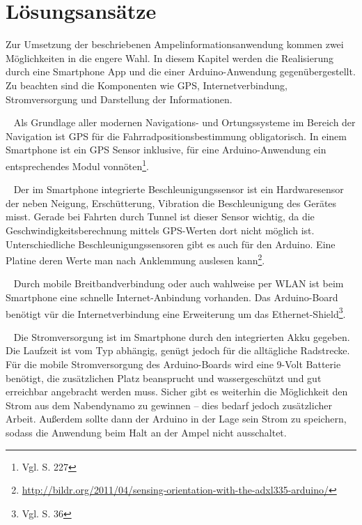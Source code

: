 \chapter{Lösungsansätze}
Zur Umsetzung der beschriebenen Ampelinformationsanwendung kommen zwei Möglichkeiten in die engere Wahl. In diesem Kapitel werden die Realisierung durch eine \gls{Smartphone} \Gls{App} und die einer \gls{Arduino}-Anwendung gegenübergestellt. Zu beachten sind die Komponenten wie \gls{GPS}, Internetverbindung, Stromversorgung und Darstellung der Informationen.\\
\begin{description}[leftmargin=0.7cm,style=nextline]
  \item[\gls{GPS}] ~ Als Grundlage aller modernen Navigations- und Ortungssysteme im Bereich der Navigation ist \gls{GPS} für die Fahrradpositionsbestimmung obligatorisch. In einem \gls{Smartphone} ist ein \gls{GPS} Sensor inklusive, für eine \gls{Arduino}-Anwendung ein entsprechendes Modul vonnöten\footnote{ Vgl. \cite{arduino} S. 227}.\\
  \item[Beschleunigungssensor] ~ Der im \gls{Smartphone} integrierte Beschleunigungssensor ist ein Hardwaresensor der neben Neigung, Erschütterung, Vibration die Beschleunigung des Gerätes misst. Gerade bei Fahrten durch Tunnel ist dieser Sensor wichtig, da die Geschwindigkeitsberechnung mittels \gls{GPS}-Werten dort nicht möglich ist. Unterschiedliche Beschleunigungssensoren gibt es auch für den \gls{Arduino}. Eine Platine deren Werte man nach Anklemmung auslesen kann\footnote{\url{http://bildr.org/2011/04/sensing-orientation-with-the-adxl335-arduino/}}.
\\
  \item[Internetverbindung] ~ Durch mobile Breitbandverbindung oder auch wahlweise per \gls{WLAN} ist beim \gls{Smartphone} eine schnelle Internet-Anbindung vorhanden. 
  Das \gls{Arduino}-Board benötigt vür die Internetverbindung eine Erweiterung um das Ethernet-Shield\footnote{ Vgl. \cite{arduino} S. 36}.\\
  \item[Stromversorgung] ~ Die Stromversorgung ist im \gls{Smartphone} durch den integrierten Akku gegeben. Die Laufzeit ist vom Typ abhängig, genügt jedoch für die alltägliche Radstrecke. Für die mobile Stromversorgung des \gls{Arduino}-Boards wird eine 9-Volt Batterie benötigt, die zusätzlichen Platz beansprucht und wassergeschützt und gut erreichbar angebracht werden muss. Sicher gibt es weiterhin die Möglichkeit den Strom aus dem Nabendynamo zu gewinnen -- dies bedarf jedoch zusätzlicher Arbeit. Außerdem sollte dann der \gls{Arduino} in der Lage sein Strom zu speichern, sodass die Anwendung beim Halt an der Ampel nicht ausschaltet.\\

\end{description}
